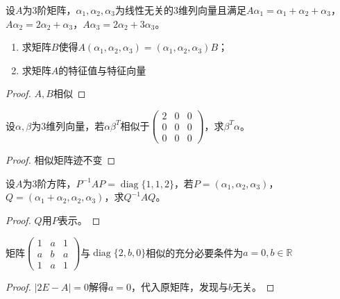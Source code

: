 \begin{theorem}
	设$A$为$3$阶矩阵，$\alpha_1,\alpha_2,\alpha_3$为线性无关的$3$维列向量且满足$A\alpha_1=\alpha_1+\alpha_2+\alpha_3$，$A\alpha_2=2\alpha_2+\alpha_3$，$A\alpha_3=2\alpha_2+3\alpha_3$。
	\begin{enumerate}
		\item 求矩阵$B$使得$A(\alpha_1,\alpha_2,\alpha_3)=(\alpha_1,\alpha_2,\alpha_3)B$；
		\item 求矩阵$A$的特征值与特征向量
	\end{enumerate}
\end{theorem}
\begin{proof}
	$A,B$相似
\end{proof}

\begin{theorem}
	设$\alpha,\beta$为$3$维列向量，若$\alpha\beta^T$相似于$
	\begin{pmatrix}
		2 & 0 & 0 \\
		0 & 0 & 0 \\
		0 & 0 & 0
	\end{pmatrix}$，求$\beta^T\alpha$。
\end{theorem}
\begin{proof}
	相似矩阵迹不变
\end{proof}

\begin{theorem}
	设$A$为$3$阶方阵，$P^{-1}AP=\operatorname{diag}\{1,1,2\}$，若$P=(\alpha_1,\alpha_2,\alpha_3)$，$Q=(\alpha_1+\alpha_2,\alpha_2,\alpha_3)$，求$Q^{-1}AQ$。
\end{theorem}
\begin{proof}
	$Q$用$P$表示。
\end{proof}

\begin{theorem}
	矩阵$\begin{pmatrix}
		1 & a & 1 \\
		a & b & a \\
		1 & a & 1
	\end{pmatrix}$与$\operatorname{diag}\{2,b,0\}$相似的充分必要条件为$a=0,b\in\mathbb{R}^{}$
\end{theorem}
\begin{proof}
	$|2E-A|=0$解得$a=0$，代入原矩阵，发现与$b$无关。
\end{proof}